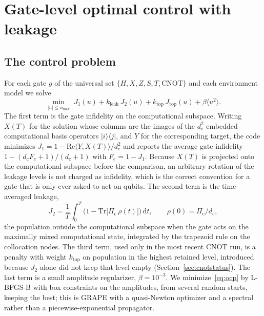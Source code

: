 \documentclass[10pt]{article}
\newcommand{\dc}{d_{\mathrm c}}
\newcommand{\dd}{\mathrm{d}}
\newcommand{\Pcomp}{\Pi_{\mathrm c}}
\begin{document}
\section{Gate-level optimal control with leakage}
\label{sec:oc}

\subsection{The control problem}

For each gate $g$ of the universal set $\{H, X, Z, S, T, \mathrm{CNOT}\}$ and
each environment model we solve
\begin{equation}
  \min_{|u| \le u_{\max}} \; J_1(u) + k_{\mathrm{leak}}\, J_2(u)
     + k_{\mathrm{top}}\, J_{\mathrm{top}}(u) + \beta \langle u^2 \rangle .
  \label{eq:ocp}
\end{equation}
The first term is the gate infidelity on the computational subspace.
Writing $X(T)$ for the solution whose columns are the images of the $\dc^2$
embedded computational basis operators $|i\rangle\langle j|$, and $Y$ for the
corresponding target, the code minimizes $J_1 = 1 - \mathrm{Re}\langle Y,
X(T)\rangle/\dc^2$ and reports the average gate infidelity
$1 - (\dc F_e + 1)/(\dc + 1)$ with $F_e = 1 - J_1$. Because $X(T)$ is
projected onto the computational subspace before the comparison, an arbitrary
rotation of the leakage levels is not charged as infidelity, which is the
correct convention for a gate that is only ever asked to act on qubits. The
second term is the time-averaged leakage,
\begin{equation}
  J_2 = \frac{1}{T}\int_0^T \Big(1 - \mathrm{Tr}\big[\Pcomp\, \rho(t)\big]\Big)\, \dd t,
  \qquad \rho(0) = \Pcomp/\dc,
  \label{eq:leak}
\end{equation}
the population outside the computational subspace when the gate acts on the
maximally mixed computational state, integrated by the trapezoid rule on the
collocation nodes. The third term, used only in the most recent CNOT run, is a
penalty with weight $k_{\mathrm{top}}$ on population in the highest retained
level, introduced because $J_2$ alone did not keep that level empty
(Section~\ref{sec:cnotstatus}). The last term is a small amplitude regularizer,
$\beta = 10^{-3}$. We minimize~\eqref{eq:ocp} by L-BFGS-B \cite{Byrd1995} with
box constraints on the amplitudes, from several random starts, keeping the
best; this is GRAPE \cite{Khaneja2005} with a quasi-Newton optimizer and a
spectral rather than a piecewise-exponential propagator.
\end{document}
